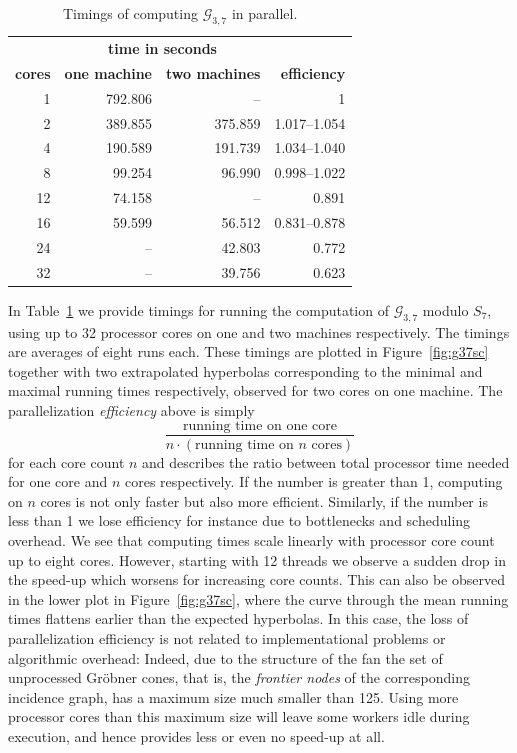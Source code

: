 \documentclass[
  paper=a4,
  titlepage,
  bibliography=totoc,
  pagesize=pdftex
]{scrartcl}
\numberwithin{figure}{section}
\numberwithin{equation}{section}
\numberwithin{table}{section}
\theoremstyle{definition}
\numberwithin{definition}{section}
\begin{document}
\begin{table}[tbh]
  \centering
  \begin{tabular}{r||r|r||r}
                   & \multicolumn{2}{c||}{\textbf{time in seconds}} &\\
    \textbf{cores} & \textbf{one machine} & \textbf{two machines} &
    \textbf{efficiency} \\ \hline
    1   & 792.806 &      -- & 1 \\
    2   & 389.855 & 375.859 & 1.017--1.054 \\
    4   & 190.589 & 191.739 & 1.034--1.040 \\
    8   &  99.254 &  96.990 & 0.998--1.022 \\
    12  &  74.158 &      -- & 0.891 \\
    16  &  59.599 &  56.512 & 0.831--0.878 \\
    24  &      -- &  42.803 & 0.772 \\
    32  &      -- &  39.756 & 0.623
  \end{tabular}
  \caption{Timings of computing $\mathcal G_{3,7}$ in parallel.}
  \label{tab:g37}
\end{table}

In Table~\ref{tab:g37} we provide timings for running the computation of $\mathcal
G_{3,7}$ modulo $S_7$, using up to 32 processor cores on one and two machines
respectively. The timings are averages of eight runs each. These timings are plotted in
Figure~\ref{fig:g37sc} together with two extrapolated hyperbolas corresponding to the
minimal and maximal running times respectively, observed for two cores on one machine. The
parallelization \emph{efficiency} above is simply
\[
  \frac{ \text{running time on one core} }{ n \cdot (\text{running time on $n$ cores})}
\]
for each core count $n$ and describes the ratio between total processor time needed for
one core and $n$ cores respectively. If the number is greater than 1, computing on $n$
cores is not only faster but also more efficient. Similarly, if the number is less than 1
we lose efficiency for instance due to bottlenecks and scheduling overhead. We see that
computing times scale linearly with processor core count up to eight cores. However,
starting with 12 threads we observe a sudden drop in the speed-up which worsens for
increasing core counts. This can also be observed in the lower plot in
Figure~\ref{fig:g37sc}, where the curve through the mean running times flattens earlier
than the expected hyperbolas. In this case, the loss of parallelization efficiency is not
related to implementational problems or algorithmic overhead: Indeed, due to the structure
of the fan the set of unprocessed Gröbner cones, that is, the \emph{frontier nodes} of the
corresponding incidence graph, has a maximum size much smaller than 125. Using more
processor cores than this maximum size will leave some workers idle during execution,
and hence provides less or even no speed-up at all.
\end{document}
